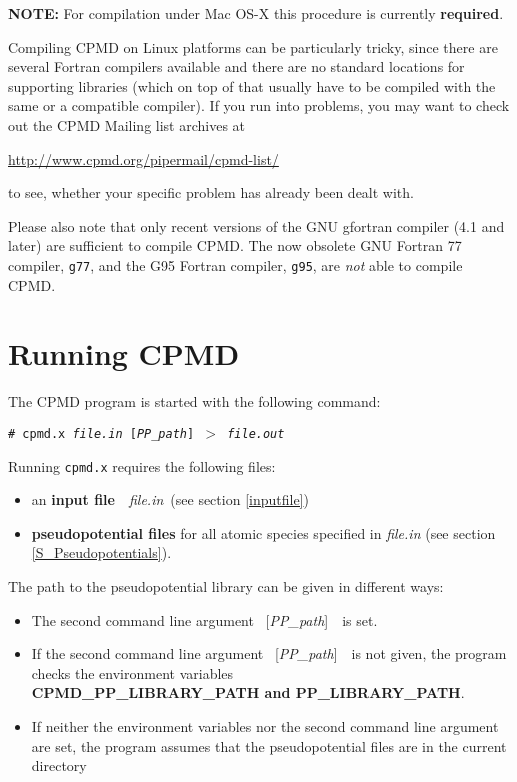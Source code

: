 \documentclass[twoside,10pt,titlepage,a4paper]{article}
\newcommand{\htref}[2]{\href{#1}{#2}}
\newcommand{\htref}[2]{\htmladdnormallink{#2}{#1}}
\newcommand{\shellcommand}[1]{%
  \vspace*{3mm}
  \noindent
  \texttt{\# #1}
  \vspace*{3mm}
}
\begin{document}
\textbf{NOTE:} For compilation under Mac OS-X this procedure is
  currently \textbf{required}.


\vspace{3mm}
  Compiling CPMD on Linux platforms can be particularly tricky,
  since there are several Fortran compilers available and there
  are no standard locations for supporting libraries (which on top
  of that usually have to be compiled with the same or a compatible
  compiler). If you run into problems, you may want to check out the
  CPMD Mailing list archives at

  \centerline{\htref{http://www.cpmd.org/pipermail/cpmd-list/}{http://www.cpmd.org/pipermail/cpmd-list/}}

  to see, whether your specific problem has already been dealt with.

\vspace{7mm}
  Please also note that only recent versions of the GNU gfortran compiler
  (4.1 and later) are sufficient to compile CPMD. The now obsolete GNU 
  Fortran 77 compiler, \texttt{g77}, and the G95 Fortran compiler, 
  \texttt{g95}, are {\em not} able to compile CPMD.
  \clearpage
\section{Running CPMD}\label{runcpmd}
%
The CPMD program is started with the following command:

\shellcommand{cpmd.x {\sl file.in} [{\sl PP\_path}] $>$ {\sl file.out}}

Running \texttt{cpmd.x} requires the following files:
\begin{itemize}
  \item an {\bf input file}\ \ {\sl file.in}\ (see section \ref{inputfile})

  \item {\bf pseudopotential files} for all atomic species specified
        in {\sl file.in} (see section \ref{S_Pseudopotentials}).
\end{itemize}

\bigskip

The path to the pseudopotential library can be given in different ways:
\begin{itemize}

\item The second command line argument \ [{\sl PP\_path}]\ \ is set.

\item If the second command line argument \ [{\sl PP\_path}]\ \ is not
  given, the program checks the environment variables\\ {\bf
    CPMD\_PP\_LIBRARY\_PATH and PP\_LIBRARY\_PATH}.

\item If neither the environment variables nor the second command line
  argument are set, the program assumes that the pseudopotential files are
  in the current directory
\end{itemize}
\end{document}

